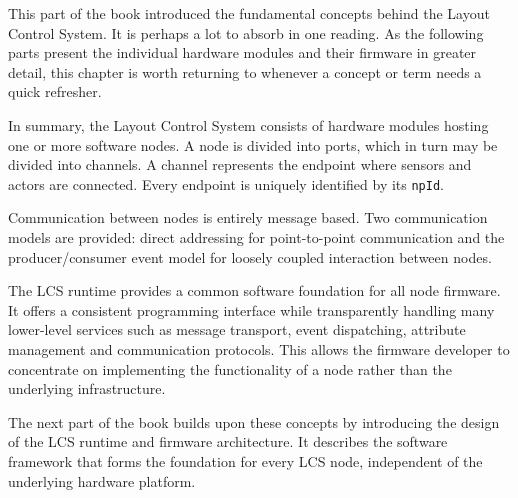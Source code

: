 
This part of the book introduced the fundamental concepts behind the Layout Control System. It is perhaps a lot to absorb in one reading. As the following parts present the individual hardware modules and their firmware in greater detail, this chapter is worth returning to whenever a concept or term needs a quick refresher.

In summary, the Layout Control System consists of hardware modules hosting one or more software nodes. A node is divided into ports, which in turn may be divided into channels. A channel represents the endpoint where sensors and actors are connected. Every endpoint is uniquely identified by its \texttt{npId}.

Communication between nodes is entirely message based. Two communication models are provided: direct addressing for point-to-point communication and the producer/consumer event model for loosely coupled interaction between nodes.

The LCS runtime provides a common software foundation for all node firmware. It offers a consistent programming interface while transparently handling many lower-level services such as message transport, event dispatching, attribute management and communication protocols. This allows the firmware developer to concentrate on implementing the functionality of a node rather than the underlying infrastructure.

The next part of the book builds upon these concepts by introducing the design of the LCS runtime and firmware architecture. It describes the software framework that forms the foundation for every LCS node, independent of the underlying hardware platform.